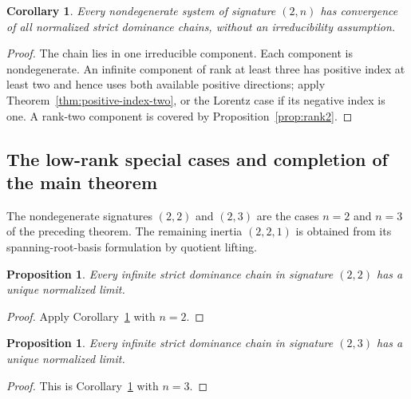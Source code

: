 \documentclass[11pt,reqno]{amsart}
\theoremstyle{plain}
\newtheorem{proposition}[theorem]{Proposition}
\newtheorem{corollary}[theorem]{Corollary}
\theoremstyle{definition}
\theoremstyle{remark}
\numberwithin{equation}{section}
\begin{document}
\begin{corollary}\label{cor:2n-reducible}
Every nondegenerate system of signature $(2,n)$ has convergence of all normalized strict dominance chains, without an irreducibility assumption.
\end{corollary}
\begin{proof}
The chain lies in one irreducible component. Each component is nondegenerate. An infinite component of rank at least three has positive index at least two and hence uses both available positive directions; apply Theorem~\ref{thm:positive-index-two}, or the Lorentz case if its negative index is one. A rank-two component is covered by Proposition~\ref{prop:rank2}.
\end{proof}

\subsection{The low-rank special cases and completion of the main theorem}\label{subsec:low-rank-completion}

The nondegenerate signatures $(2,2)$ and $(2,3)$ are the cases $n=2$
and $n=3$ of the preceding theorem. The remaining inertia $(2,2,1)$
is obtained from its spanning-root-basis formulation by quotient lifting.

\begin{proposition}\label{prop:22-special-case}
Every infinite strict dominance chain in signature $(2,2)$ has a unique normalized limit.
\end{proposition}
\begin{proof}
Apply Corollary~\ref{cor:2n-reducible} with $n=2$.
\end{proof}

\begin{proposition}\label{prop:23-special-case}
Every infinite strict dominance chain in signature $(2,3)$ has a unique normalized limit.
\end{proposition}
\begin{proof}
This is Corollary~\ref{cor:2n-reducible} with $n=3$.
\end{proof}
\end{document}
